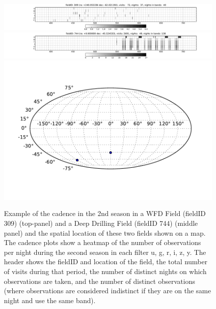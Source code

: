\begin{figure}
 \centering
 \includegraphics[width=\textwidth]{figs/supernova/fig_309_2ndYear}
 \includegraphics[width=\textwidth]{figs/supernova/fig_744_2ndYear}
 \includegraphics[height=0.2\textheight]{figs/supernova/loc_309_744.pdf}
 \caption{Example of the cadence in the 2nd season in a WFD Field
 (fieldID 309) (top-panel) and a Deep Drilling Field (fieldID 744)
 (middle panel) and the spatial location of these two fields shown on a
 map. The cadence plots show a heatmap of the number of observations per
 night during the second season in each filter u, g, r, i, z, y. 
 The header shows the fieldID and location of
 the field, the total number of visits during that period, the number of
 distinct nights on which observations are taken, and the number of
 distinct observations (where observations are considered indistinct
 if they are on the same night and use the same band).}
  \label{fig:SN_sampling}
\end{figure}


